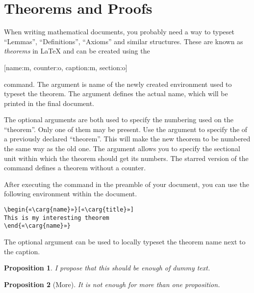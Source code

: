 \section{Theorems and Proofs}

When writing mathematical documents, you probably need a way to typeset
\enquote{Lemmas}, \enquote{Definitions}, \enquote{Axioms} and similar
structures. These are known as \emph{theorems} in \LaTeX{} and can be created
using the
\begin{lscommand}
  [name:m, counter:o, caption:m, section:o]
\end{lscommand}
command. The  argument is name of the newly created environment used
to typeset the theorem. The  argument defines the actual name,
which will be printed in the final document.

The optional arguments are both used to specify the numbering used on the
\enquote{theorem}. Only one of them may be present. Use the 
argument to specify the  of a previously declared \enquote{theorem}.
This will make the new theorem to be numbered the same way as the old one. The
 argument allows you to specify the sectional unit within which
the theorem should get its numbers. The starred version of the command defines
a theorem without a counter.

After executing the  command in the preamble of your document,
you can use the following environment within the document.
\begin{verbatim}
\begin{«\carg{name}»}[«\carg{title}»]
This is my interesting theorem
\end{«\carg{name}»}
\end{verbatim}
The optional  argument can be used to locally typeset the theorem
name next to the caption.
\begin{example}[standalone, paperheight=4cm]
\newtheorem{proposition}{Proposition}
\begin{proposition}
  I propose that this should 
  be enough of dummy text.
\end{proposition}
\begin{proposition}[More]
  It is not enough for more
  than one proposition.
\end{proposition}
\end{example}

